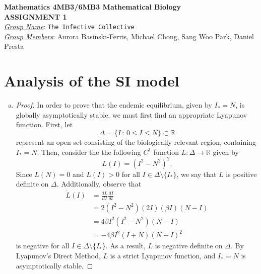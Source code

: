 \documentclass[12pt]{article}
\begin{document}
\begin{center}
{\bfseries Mathematics 4MB3/6MB3 Mathematical Biology\\
 ASSIGNMENT {\color{blue}1}}\\
\medskip
\underline{\emph{Group Name}}: \texttt{{\color{blue}The Infective Collective}}\\
\medskip
\underline{\emph{Group Members}}: {\color{blue} Aurora Basinski-Ferris, Michael Chong, Sang Woo Park, Daniel Presta}
\end{center}

\section{Analysis of the SI model}

\SIanalIntro
\begin{enumerate}[(a)]
\item \SIanalQa
  
  {\color{blue}
    \begin{proof}
      In order to prove that the endemic equilibrium, given by $I_\ast = N$, is globally asymptotically stable, we must first find an appropriate Lyapunov function. First, let 
\begin{equation*}
\Delta = \{I \,:\, 0 \leq I \leq N\} \subset \mathbb{R}
\end{equation*}
represent an open set consisting of the biologically relevant region, containing $I_\ast = N$. Then, consider the the following $C^1$ function $L: \Delta \to \mathbb{R}$ given by
\begin{equation*}
L(I) = (I^2 - N^2)^2.
\end{equation*}
Since $L(N) = 0$ and $L(I) > 0$ for all $I \in \Delta \setminus \{I_\ast\}$, we say that $L$ is positive definite on $\Delta$. Additionally, observe that
\begin{equation*}
\begin{aligned}
\dot{L}(I) &= \frac{dL}{dI} \frac{dI}{dt} \\
&= 2(I^2 - N^2)(2 I)(\beta I)(N-I) \\
&= 4 \beta I^2 (I^2 - N^2)(N-I)\\
& = - 4 \beta I^2  (I+N) (N-I)^2
\end{aligned}
\end{equation*}
is negative for all $I \in \Delta \setminus \{I_\ast\}$. As a result, $L$ is negative definite on $\Delta$. By Lyapunov's Direct Method, $L$ is a strict Lyapunov function, and $I_\ast=N$ is asymptotically stable.


\end{proof}}
\end{enumerate}
\end{document}
